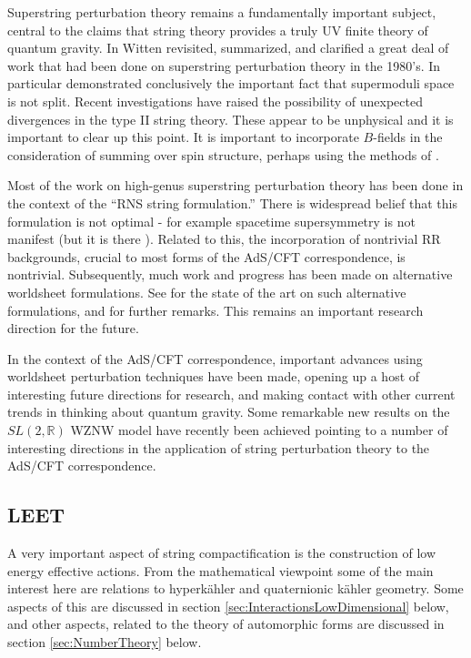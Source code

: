 \documentclass[12pt]{article}
\begin{document}
Superstring perturbation theory remains a fundamentally
important subject, central to the claims that string theory
provides a truly UV finite theory of quantum gravity.
In \cite{Witten:2013cia,Witten:2019uux} Witten revisited, summarized, and clarified
a great deal of work that had been done on superstring perturbation
theory in the 1980's. In particular \cite{Donagi:2013dua}  demonstrated conclusively
the important fact that supermoduli space is not split.
Recent investigations  \cite{Felder:2019iqj,Felder:2020odc}  have raised the possibility of
unexpected divergences in the type II string theory. These
appear to be unphysical and it is important to clear up
this point. It is important to incorporate $B$-fields in the
consideration of summing over spin structure, perhaps using
the methods of \cite{Distler:2010an,Kaidi:2019pzj,Kaidi:2019tyf}.

Most of the work on high-genus superstring perturbation theory
has been done in the context of the ``RNS string formulation.''
There is widespread belief that this formulation is not optimal -
for example spacetime supersymmetry is not manifest (but it is there \cite{Friedan:1985ge}).
Related to this, the incorporation of nontrivial RR backgrounds, crucial to most
forms of the AdS/CFT correspondence,  is nontrivial.
Subsequently,   much work and progress has been made on alternative
worldsheet formulations. See \cite{Berkovits:2021xwh} 
for the state of the art on such
alternative formulations, and \cite{Commando}  for further remarks. 
This remains an important research
direction for the future.

In the context of the AdS/CFT correspondence, important advances
using worldsheet perturbation techniques have been made, opening up a host of interesting future
directions for research, and making contact with other
current trends in thinking about quantum gravity. Some remarkable new results on
the $SL(2,\mathbb{R})$ WZNW model have recently been achieved \cite{Dei:2021xgh,Eberhardt:2019ywk,Eberhardt:2021jvj}
pointing to a number of interesting directions in the application of string perturbation theory
to the AdS/CFT correspondence.




\subsection{LEET}

A very important aspect of string compactification is 
the construction of low energy effective actions. 
From the mathematical viewpoint some of the main interest 
here are relations to hyperk\"ahler and quaternionic k\"ahler 
geometry. Some aspects of this are discussed in 
section \ref{sec:InteractionsLowDimensional} below, and other 
aspects, related to   the theory of automorphic forms
are discussed in section \ref{sec:NumberTheory}
below.  
\end{document}
